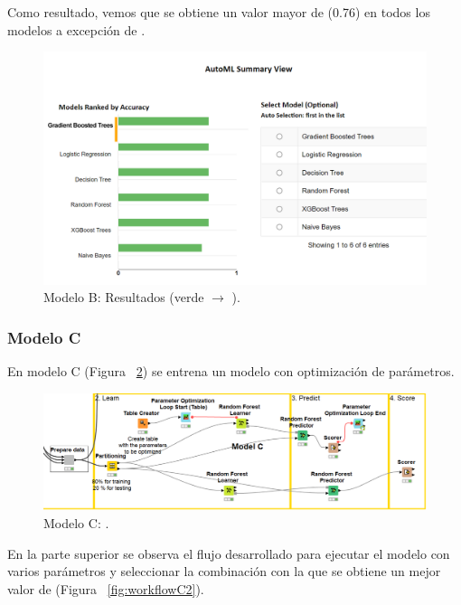 Como resultado, vemos que se obtiene un valor mayor de  (0.76) en todos los modelos a excepción de . 

\begin{figure}[!htb]
	\centering
	\includegraphics[width=1\textwidth]{img/workflowB3.png}
	\caption{Modelo B: Resultados (verde $\rightarrow$ ).}
	\label{fig:workflowB3}
\end{figure}
\FloatBarrier

\subsubsection{Modelo C}

En modelo C (Figura ~\ref{fig:workflowC1}) se entrena un modelo  con optimización de parámetros. 

\begin{figure}[!htb]
	\centering
	\includegraphics[width=1\textwidth]{img/workflowC1.png}
	\caption{Modelo C: .}
	\label{fig:workflowC1}
\end{figure}
\FloatBarrier

En la parte superior se observa el flujo desarrollado para ejecutar el modelo con varios parámetros y seleccionar la combinación con la 
que se obtiene un mejor valor de  (Figura ~\ref{fig:workflowC2}). 

